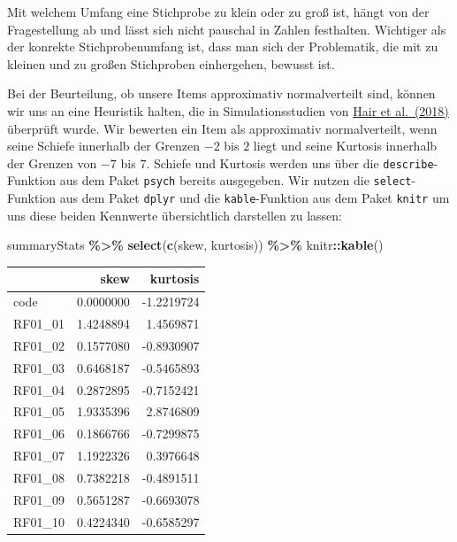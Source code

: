 \documentclass[
  ngerman,
]{book}
\newenvironment{Shaded}{\begin{snugshade}}{\end{snugshade}}
\newcommand{\FunctionTok}[1]{\textcolor[rgb]{0.13,0.29,0.53}{\textbf{#1}}}
\newcommand{\NormalTok}[1]{#1}
\newcommand{\SpecialCharTok}[1]{\textcolor[rgb]{0.81,0.36,0.00}{\textbf{#1}}}
\begin{document}
Mit welchem Umfang eine Stichprobe zu klein oder zu groß ist, hängt von der Fragestellung ab und lässt sich nicht pauschal in Zahlen festhalten. Wichtiger als der konrekte Stichprobenumfang ist, dass man sich der Problematik, die mit zu kleinen und zu großen Stichproben einhergehen, bewusst ist.

Bei der Beurteilung, ob unsere Items approximativ normalverteilt sind, können wir uns an eine Heuristik halten, die in Simulationsstudien von \href{https://hds.hebis.de/ubmz/Record/HEB432535284}{Hair et al.~(2018)} überprüft wurde. Wir bewerten ein Item als approximativ normalverteilt, wenn seine Schiefe innerhalb der Grenzen \(-2\) bis \(2\) liegt und seine Kurtosis innerhalb der Grenzen von \(-7\) bis \(7\). Schiefe und Kurtosis werden uns über die \texttt{describe}-Funktion aus dem Paket \texttt{psych} bereits ausgegeben. Wir nutzen die \texttt{select}-Funktion aus dem Paket \texttt{dplyr} und die \texttt{kable}-Funktion aus dem Paket \texttt{knitr} um uns diese beiden Kennwerte übersichtlich darstellen zu lassen:

\begin{Shaded}
\begin{Highlighting}[]
\NormalTok{summaryStats }\SpecialCharTok{\%\textgreater{}\%} 
  \FunctionTok{select}\NormalTok{(}\FunctionTok{c}\NormalTok{(skew, kurtosis)) }\SpecialCharTok{\%\textgreater{}\%} 
\NormalTok{  knitr}\SpecialCharTok{::}\FunctionTok{kable}\NormalTok{()}
\end{Highlighting}
\end{Shaded}

\begin{tabular}{l|r|r}
\hline
  & skew & kurtosis\\
\hline
code & 0.0000000 & -1.2219724\\
\hline
RF01\_01 & 1.4248894 & 1.4569871\\
\hline
RF01\_02 & 0.1577080 & -0.8930907\\
\hline
RF01\_03 & 0.6468187 & -0.5465893\\
\hline
RF01\_04 & 0.2872895 & -0.7152421\\
\hline
RF01\_05 & 1.9335396 & 2.8746809\\
\hline
RF01\_06 & 0.1866766 & -0.7299875\\
\hline
RF01\_07 & 1.1922326 & 0.3976648\\
\hline
RF01\_08 & 0.7382218 & -0.4891511\\
\hline
RF01\_09 & 0.5651287 & -0.6693078\\
\hline
RF01\_10 & 0.4224340 & -0.6585297\\
\hline
\end{tabular}
\end{document}
